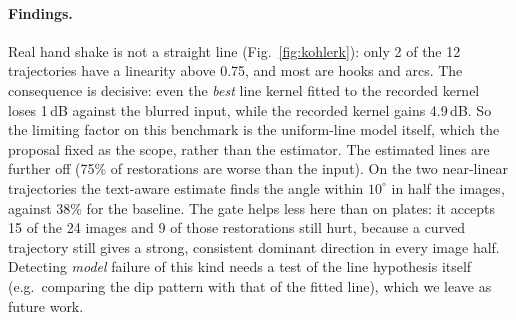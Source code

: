 \paragraph{Findings.} Real hand shake is not a straight line (Fig.~\ref{fig:kohlerk}): only 2 of the
12 trajectories have a linearity above 0.75, and most are hooks and arcs. The consequence is
decisive: even the \emph{best} line kernel fitted to the recorded kernel loses 1\,dB against the
blurred input, while the recorded kernel gains 4.9\,dB. So the limiting factor on this benchmark is
the uniform-line model itself, which the proposal fixed as the scope, rather than the estimator. The
estimated lines are further off (75\% of restorations are worse than the input). On the two
near-linear trajectories the text-aware estimate finds the angle within $10^\circ$ in half the images,
against 38\% for the baseline. The gate helps less here than on plates: it accepts 15 of the 24
images and 9 of those restorations still hurt, because a curved trajectory still gives a strong,
consistent dominant direction in every image half. Detecting \emph{model} failure of this kind needs
a test of the line hypothesis itself (e.g.\ comparing the dip pattern with that of the fitted line),
which we leave as future work.
